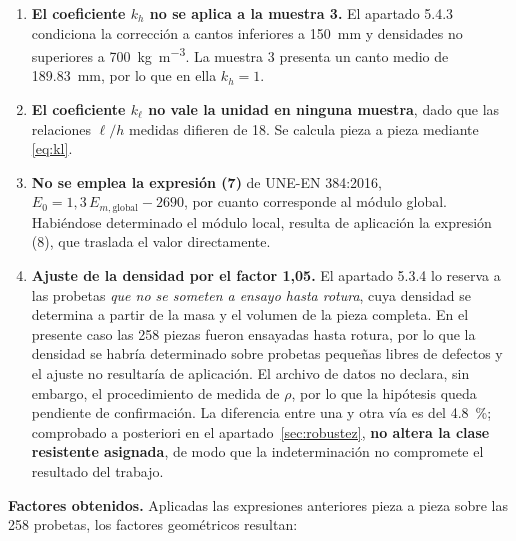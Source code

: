 \documentclass[11pt,a4paper]{article}
\newcommand{\Ecero}{E_{0}}
\begin{document}
\begin{enumerate}
  \item \textbf{El coeficiente $k_{h}$ no se aplica a la muestra 3.} El apartado 5.4.3
        condiciona la corrección a cantos inferiores a \SI{150}{\milli\meter} y
        densidades no superiores a \SI{700}{\kilo\gram\per\cubic\meter}. La muestra 3
        presenta un canto medio de \SI{189,83}{\milli\meter}, por lo que en ella
        $k_{h} = 1$.
  \item \textbf{El coeficiente $k_{\ell}$ no vale la unidad en ninguna muestra}, dado
        que las relaciones $\ell/h$ medidas difieren de 18. Se calcula pieza a pieza
        mediante \eqref{eq:kl}.
  \item \textbf{No se emplea la expresión (7)} de UNE-EN 384:2016,
        $\Ecero = 1{,}3\,E_{m,\text{global}} - 2690$, por cuanto corresponde al módulo
        global. Habiéndose determinado el módulo local, resulta de aplicación la
        expresión (8), que traslada el valor directamente.
  \item \textbf{Ajuste de la densidad por el factor 1,05.} El apartado 5.3.4 lo
        reserva a las probetas \emph{que no se someten a ensayo hasta rotura}, cuya
        densidad se determina a partir de la masa y el volumen de la pieza completa.
        En el presente caso las \num{258} piezas fueron ensayadas hasta rotura, por lo
        que la densidad se habría determinado sobre probetas pequeñas libres de
        defectos y el ajuste no resultaría de aplicación.
        El archivo de datos no declara, sin embargo, el procedimiento de medida de
        $\rho$, por lo que la hipótesis queda pendiente de confirmación. La diferencia
        entre una y otra vía es del \SI{4,8}{\percent}; comprobado a posteriori en el
        apartado~\ref{sec:robustez}, \textbf{no altera la clase resistente asignada},
        de modo que la indeterminación no compromete el resultado del trabajo.
\end{enumerate}

\medskip
\noindent\textbf{Factores obtenidos.} Aplicadas las expresiones anteriores pieza a
pieza sobre las \num{258} probetas, los factores geométricos resultan:
\end{document}
